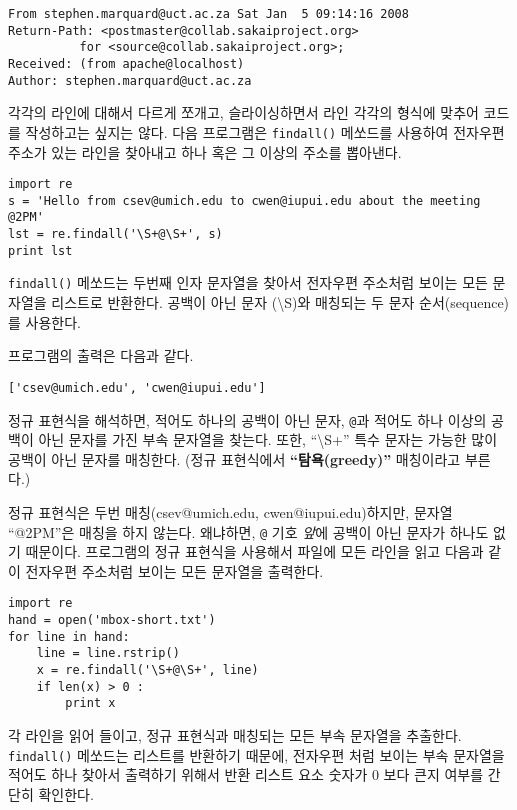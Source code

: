 \beforeverb
\begin{verbatim}
From stephen.marquard@uct.ac.za Sat Jan  5 09:14:16 2008
Return-Path: <postmaster@collab.sakaiproject.org>
          for <source@collab.sakaiproject.org>;
Received: (from apache@localhost)
Author: stephen.marquard@uct.ac.za
\end{verbatim}
\afterverb
%

각각의 라인에 대해서 다르게 쪼개고, 슬라이싱하면서 라인 각각의 형식에 맞추어 코드를 작성하고는 싶지는 않다.
다음 프로그램은 {\tt findall()} 메쏘드를 사용하여 전자우편 주소가 있는 라인을 찾아내고 하나 혹은 그 이상의 주소를 뽑아낸다.


\beforeverb
\begin{verbatim}
import re
s = 'Hello from csev@umich.edu to cwen@iupui.edu about the meeting @2PM'
lst = re.findall('\S+@\S+', s)
print lst
\end{verbatim}
\afterverb
%

{\tt findall()} 메쏘드는 두번째 인자 문자열을 찾아서 전자우편 주소처럼 보이는 모든 문자열을 리스트로 반환한다.
공백이 아닌 문자 ({\textbackslash}S)와 매칭되는 두 문자 순서(sequence)를 사용한다.

프로그램의 출력은 다음과 같다.

\beforeverb
\begin{verbatim}
['csev@umich.edu', 'cwen@iupui.edu']
\end{verbatim}
\afterverb
%

정규 표현식을 해석하면, 적어도 하나의 공백이 아닌 문자, {\verb"@"}과 적어도 하나 이상의 공백이 아닌 문자를 가진 부속 문자열을 찾는다.
또한, ``{\textbackslash}S+'' 특수 문자는 가능한 많이 공백이 아닌 문자를 매칭한다. (정규 표현식에서  {\bf ``탐욕(greedy)''} 매칭이라고 부른다.)

정규 표현식은 두번 매칭(csev@umich.edu, cwen@iupui.edu)하지만, 문자열 ``@2PM''은 매칭을 하지 않는다.
왜냐하면, {\verb"@"} 기호 {\em 앞}에 공백이 아닌 문자가 하나도 없기 때문이다.
프로그램의 정규 표현식을 사용해서 파일에 모든 라인을 읽고 다음과 같이 전자우편 주소처럼 보이는 모든 문자열을 출력한다.

\beforeverb
\begin{verbatim}
import re
hand = open('mbox-short.txt')
for line in hand:
    line = line.rstrip()
    x = re.findall('\S+@\S+', line)
    if len(x) > 0 :
        print x
\end{verbatim}
\afterverb
%
각 라인을 읽어 들이고, 정규 표현식과 매칭되는 모든 부속 문자열을 추출한다. 
{\tt findall()} 메쏘드는 리스트를 반환하기 때문에, 전자우편 처럼 보이는 부속 문자열을 적어도 하나 찾아서 출력하기 위해서 
반환 리스트 요소 숫자가 0 보다 큰지 여부를 간단히 확인한다.

